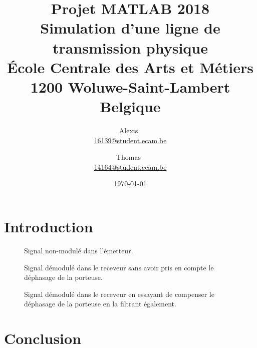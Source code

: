 \documentclass[10pt, oneside, a4paper]{article}
\date{%
        \today
    }
\author{%
        Alexis~\bsc{Nootens} \\
        \href{mailto:16139@student.ecam.be}{16139@student.ecam.be}
        \and
        Thomas~\bsc{Anizet} \\
        \href{mailto:14164@student.ecam.be}{14164@student.ecam.be}
    }
\title{%
        \color{gray}\LARGE\bfseries\sffamily
        Projet MATLAB\textregistered{} 2018             \\[3mm]
        \rm\sffamily\large
        Simulation d'une ligne de transmission physique \\[7mm]
        École Centrale des Arts et Métiers 		        \\
        1200 Woluwe-Saint-Lambert				        \\
        Belgique
    }
\begin{document}
\maketitle

\section*{Introduction}

\begin{figure}[htbp]
	\centering
	\resizebox{\textwidth}{!}{%
		
	}
	\caption{Signal non-modulé dans l'émetteur.}
\end{figure}
\begin{figure}[htbp]
	\centering
	\resizebox{\textwidth}{!}{%
		
	}
	\caption{Signal démodulé dans le receveur sans avoir pris en compte
			le déphasage de la porteuse.}
\end{figure}
\begin{figure}[htbp]
	\centering
	\resizebox{\textwidth}{!}{%
		
	}
	\caption{Signal démodulé dans le receveur en essayant de compenser le
			déphasage de la porteuse en la filtrant également.}
\end{figure}

\section*{Conclusion}
\end{document}

